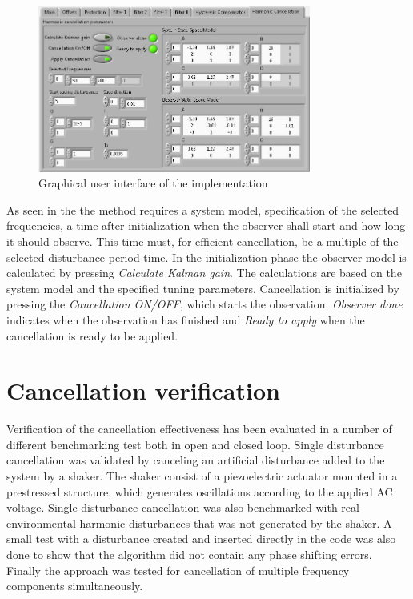 \begin{figure}[h]
  \centering %
  \includegraphics[width=0.8\textwidth]{fig/HC_gui}
  \caption{\label{fig:gui}Graphical user interface of the \abbrRFDC implementation}
\end{figure}

As seen in the \abbrGUI the method requires a system model, specification of the selected frequencies, a time after initialization when the observer shall start and how long it should observe. This time must, for efficient cancellation, be a multiple of the selected disturbance period time. In the initialization phase the observer model is calculated by pressing \emph{Calculate Kalman gain}. The calculations are based on the system model and the specified tuning parameters. Cancellation is initialized by pressing the \emph{Cancellation ON/OFF}, which starts the observation. \emph{Observer done} indicates when the observation has finished and \emph{Ready to apply} when the cancellation is ready to be applied.

\section{Cancellation verification}
Verification of the cancellation effectiveness has been evaluated in a number of different benchmarking test both in open and closed loop. Single disturbance cancellation was validated by canceling an artificial disturbance added to the system by a shaker. The shaker consist of a piezoelectric actuator mounted in a prestressed structure, which generates oscillations according to the applied AC voltage. Single disturbance cancellation was also benchmarked with real environmental harmonic disturbances that was not generated by the shaker. A small test with a disturbance created and inserted directly in the code was also done to show that the algorithm did not contain any phase shifting errors. Finally the approach was tested for cancellation of multiple frequency components simultaneously.

